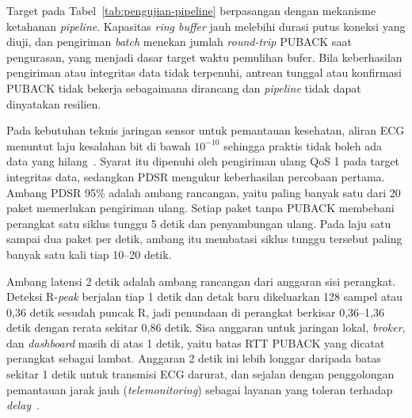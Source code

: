 Target pada Tabel~\ref{tab:pengujian-pipeline} berpasangan dengan mekanisme ketahanan \textit{pipeline}. Kapasitas \textit{ring buffer} jauh melebihi durasi putus koneksi yang diuji, dan pengiriman \textit{batch} menekan jumlah \textit{round-trip} PUBACK saat pengurasan, yang menjadi dasar target waktu pemulihan bufer. Bila keberhasilan pengiriman atau integritas data tidak terpenuhi, antrean tunggal atau konfirmasi PUBACK tidak bekerja sebagaimana dirancang dan \textit{pipeline} tidak dapat dinyatakan resilien.

Pada kebutuhan teknis jaringan sensor untuk pemantauan kesehatan, aliran ECG menuntut laju kesalahan bit di bawah $10^{-10}$ sehingga praktis tidak boleh ada data yang hilang~\cite{zhong_2022}. Syarat itu dipenuhi oleh pengiriman ulang QoS 1 pada target integritas data, sedangkan PDSR mengukur keberhasilan percobaan pertama. Ambang PDSR 95\% adalah ambang rancangan, yaitu paling banyak satu dari 20 paket memerlukan pengiriman ulang. Setiap paket tanpa PUBACK membebani perangkat satu siklus tunggu 5 detik dan penyambungan ulang. Pada laju satu sampai dua paket per detik, ambang itu membatasi siklus tunggu tersebut paling banyak satu kali tiap 10--20 detik.

Ambang latensi 2 detik adalah ambang rancangan dari anggaran sisi perangkat. Deteksi R-\textit{peak} berjalan tiap 1 detik dan detak baru dikeluarkan 128 sampel atau 0,36 detik sesudah puncak R, jadi penundaan di perangkat berkisar 0,36--1,36 detik dengan rerata sekitar 0,86 detik. Sisa anggaran untuk jaringan lokal, \textit{broker}, dan \textit{dashboard} masih di atas 1 detik, yaitu batas RTT PUBACK yang dicatat perangkat sebagai lambat. Anggaran 2 detik ini lebih longgar daripada batas sekitar 1 detik untuk transmisi ECG darurat, dan sejalan dengan penggolongan pemantauan jarak jauh (\textit{telemonitoring}) sebagai layanan yang toleran terhadap \textit{delay}~\cite{skorinkapov_2010}.

